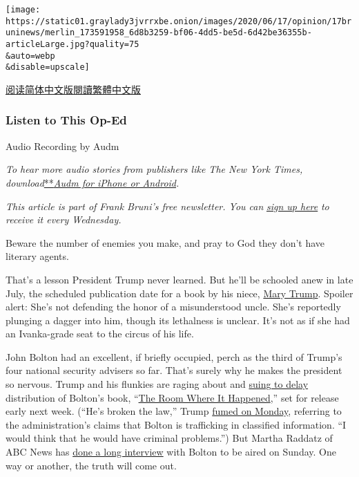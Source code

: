 \texttt{[image: https://static01.graylady3jvrrxbe.onion/images/2020/06/17/opinion/17bruninews/merlin\_173591958\_6d8b3259-bf06-4dd5-be5d-6d42be36355b-articleLarge.jpg?quality=75\\\&auto=webp\\\&disable=upscale]}

\href{https://cn.nytimes3xbfgragh.onion/opinion/20200622/trump-mary-book/}{阅读简体中文版}\href{https://cn.nytimes3xbfgragh.onion/opinion/20200622/trump-mary-book/zh-hant/}{閱讀繁體中文版}

\hypertarget{listen-to-this-op-ed}{%
\subsubsection{Listen to This Op-Ed}\label{listen-to-this-op-ed}}

Audio Recording by Audm

\emph{To hear more audio stories from publishers like The New York
Times,
download}\href{https://www.audm.com/?utm_source=nytmag\&utm_medium=embed\&utm_campaign=left_behind_draper}{**}\href{https://www.audm.com/?utm_source=nytopinion\&utm_medium=embed\&utm_campaign=revenge_trump_tattletales}{\emph{Audm
for iPhone or Android}}\emph{.}

\emph{This article is part of Frank Bruni's free newsletter. You can}
\href{https://www.nytimes3xbfgragh.onion/newsletters/frank-bruni}{\emph{sign
up here}} \emph{to receive it every Wednesday.}

Beware the number of enemies you make, and pray to God they don't have
literary agents.

That's a lesson President Trump never learned. But he'll be schooled
anew in late July, the scheduled publication date for a book by his
niece,
\href{https://www.nytimes3xbfgragh.onion/2020/07/01/us/politics/mary-trump-book-lawsuit.html}{Mary
Trump}. Spoiler alert: She's not defending the honor of a misunderstood
uncle. She's reportedly plunging a dagger into him, though its
lethalness is unclear. It's not as if she had an Ivanka-grade seat to
the circus of his life.

John Bolton had an excellent, if briefly occupied, perch as the third of
Trump's four national security advisers so far. That's surely why he
makes the president so nervous. Trump and his flunkies are raging about
and
\href{https://www.nytimes3xbfgragh.onion/2020/06/16/us/politics/john-bolton-book-publication.html}{suing
to delay} distribution of Bolton's book,
``\href{https://www.nytimes3xbfgragh.onion/2020/06/17/books/review-room-where-it-happened-john-bolton-memoir.html}{The
Room Where It Happened},'' set for release early next week. (``He's
broken the law,'' Trump
\href{https://abcnews.go.com/Politics/note-trumps-threats-boost-boltons-book/story?id=71259356}{fumed
on Monday}, referring to the administration's claims that Bolton is
trafficking in classified information. ``I would think that he would
have criminal problems.'') But Martha Raddatz of ABC News has
\href{https://deadline.com/2020/06/john-bolton-abc-news-donald-trump-martha-raddatz-1202959216/}{done
a long interview} with Bolton to be aired on Sunday. One way or another,
the truth will come out.

